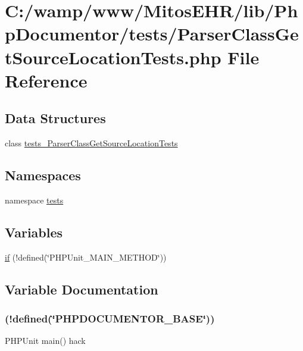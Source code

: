 \hypertarget{_parser_class_get_source_location_tests_8php}{\section{\-C\-:/wamp/www/\-Mitos\-E\-H\-R/lib/\-Php\-Documentor/tests/\-Parser\-Class\-Get\-Source\-Location\-Tests.php \-File \-Reference}
\label{_parser_class_get_source_location_tests_8php}
}
\subsection*{\-Data \-Structures}
\begin{DoxyCompactItemize}
\item 
class \hyperlink{classtests___parser_class_get_source_location_tests}{tests\-\_\-\-Parser\-Class\-Get\-Source\-Location\-Tests}
\end{DoxyCompactItemize}
\subsection*{\-Namespaces}
\begin{DoxyCompactItemize}
\item 
namespace \hyperlink{namespacetests}{tests}
\end{DoxyCompactItemize}
\subsection*{\-Variables}
\begin{DoxyCompactItemize}
\item 
\hyperlink{_parser_class_get_source_location_tests_8php_ae3cacee49c3c7d622bb92397daeb7733}{if} (!defined(\char`\"{}\-P\-H\-P\-Unit\-\_\-\-M\-A\-I\-N\-\_\-\-M\-E\-T\-H\-O\-D\char`\"{}))
\end{DoxyCompactItemize}


\subsection{\-Variable \-Documentation}
\hypertarget{_parser_class_get_source_location_tests_8php_ae3cacee49c3c7d622bb92397daeb7733}{
\subsubsection[{if}]{(!defined(\char`\"{}\-P\-H\-P\-D\-O\-C\-U\-M\-E\-N\-T\-O\-R\-\_\-\-B\-A\-S\-E\char`\"{}))}}\label{_parser_class_get_source_location_tests_8php_ae3cacee49c3c7d622bb92397daeb7733}
\-P\-H\-P\-Unit main() hack

